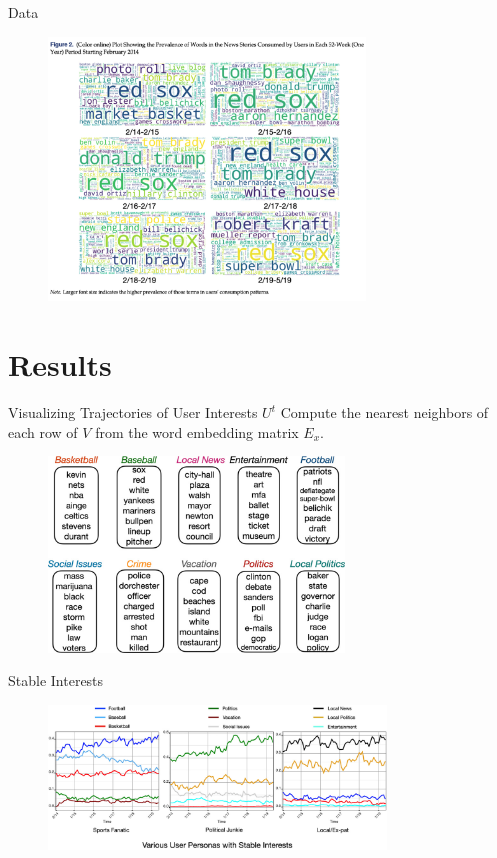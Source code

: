 \documentclass{beamer}
\begin{document}
\begin{frame}[allowframebreaks]{Data}
	\begin{figure}[htpb]
		\centering
		\includegraphics[width=0.75\textwidth]{pic/tokens.png}
	\end{figure}
\end{frame}

\section{Results}

\begin{frame}{Visualizing Trajectories of User Interests $U^{t}$}
	Compute the nearest neighbors of each row of $V$ from the word embedding matrix $E_x$.
	\begin{figure}[htpb]
		\centering
		\includegraphics[width=0.7\textwidth]{pic/word-dist.png}
	\end{figure}
\end{frame}

\begin{frame}{Stable Interests}
	\begin{figure}[htpb]
		\centering
		\includegraphics[width=0.8\textwidth]{pic/stable-interests.png}
	\end{figure}
\end{frame}
\end{document}
